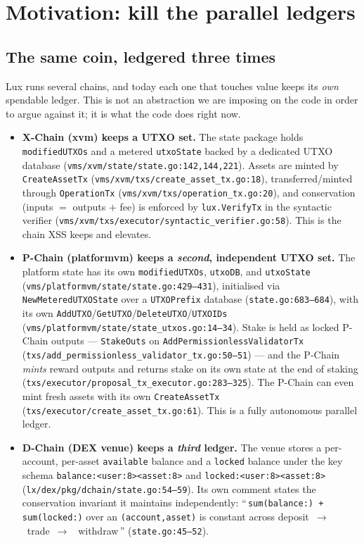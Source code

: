 \section{Motivation: kill the parallel ledgers}
\label{sec:motivation}

\subsection{The same coin, ledgered three times}

Lux runs several chains, and today each one that touches value keeps
its \emph{own} spendable ledger. This is not an abstraction we are
imposing on the code in order to argue against it; it is what the code
does right now.

\begin{itemize}[leftmargin=2em]
\item \textbf{X-Chain (xvm) keeps a UTXO set.} \IMPL{} The state
  package holds \texttt{modifiedUTXOs} and a metered
  \texttt{utxoState} backed by a dedicated UTXO database
  (\texttt{vms/xvm/state/state.go:142,144,221}). Assets are minted by
  \texttt{CreateAssetTx} (\texttt{vms/xvm/txs/create\_asset\_tx.go:18}),
  transferred/minted through \texttt{OperationTx}
  (\texttt{vms/xvm/txs/operation\_tx.go:20}), and conservation
  (inputs $=$ outputs $+$ fee) is enforced by \texttt{lux.VerifyTx}
  in the syntactic verifier
  (\texttt{vms/xvm/txs/executor/syntactic\_verifier.go:58}). This is
  the chain XSS keeps and elevates.

\item \textbf{P-Chain (platformvm) keeps a \emph{second}, independent
  UTXO set.} \IMPL{} The platform state has its own
  \texttt{modifiedUTXOs}, \texttt{utxoDB}, and \texttt{utxoState}
  (\texttt{vms/platformvm/state/state.go:429--431}), initialised via
  \texttt{NewMeteredUTXOState} over a \texttt{UTXOPrefix} database
  (\texttt{state.go:683--684}), with its own
  \texttt{AddUTXO}/\texttt{GetUTXO}/\texttt{DeleteUTXO}/\texttt{UTXOIDs}
  (\texttt{vms/platformvm/state/state\_utxos.go:14--34}). Stake is held
  as locked P-Chain outputs --- \texttt{StakeOuts} on
  \texttt{AddPermissionlessValidatorTx}
  (\texttt{txs/add\_permissionless\_validator\_tx.go:50--51}) --- and
  the P-Chain \emph{mints} reward outputs and returns stake on its own
  state at the end of staking
  (\texttt{txs/executor/proposal\_tx\_executor.go:283--325}). The
  P-Chain can even mint fresh assets with its own
  \texttt{CreateAssetTx} (\texttt{txs/executor/create\_asset\_tx.go:61}).
  This is a fully autonomous parallel ledger.

\item \textbf{D-Chain (DEX venue) keeps a \emph{third} ledger.} \IMPL{}
  The venue stores a per-account, per-asset \texttt{available} balance
  and a \texttt{locked} balance under the key schema
  \texttt{balance:<user:8><asset:8>} and
  \texttt{locked:<user:8><asset:8>}
  (\texttt{lx/dex/pkg/dchain/state.go:54--59}). Its own comment states
  the conservation invariant it maintains independently:
  ``\,\texttt{sum(balance:) + sum(locked:)} over an
  \texttt{(account,asset)} is constant across deposit~$\to$~trade~$\to$
  ~withdraw\,'' (\texttt{state.go:45--52}).
\end{itemize}

